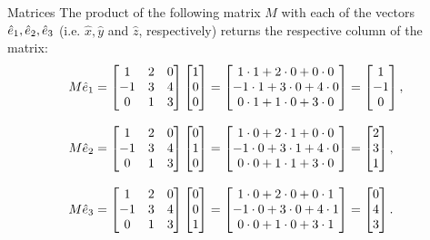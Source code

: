 \begin{example}{Matrices}{}
	The product of the following matrix $M$ with each of the vectors $\hat{e}_{1},\hat{e}_{2},\hat{e}_{3}$ (i.e. $\hat{x},\hat{y}$ and $\hat{z}$, respectively) returns the respective column of the matrix:
	\begin{align*}
		M\eb{1}=
		\begin{bmatrix}
			 1 & 2 & 0\\
			-1 & 3 & 4\\
			 0 & 1 & 3\\
		 \end{bmatrix}\colvec{1;0;0} &= \colvec{1\cdot1+2\cdot0+0\cdot0;-1\cdot1+3\cdot0+4\cdot0;0\cdot1+1\cdot0+3\cdot0} = \colvec{1;-1;0},\\[3mm]
		M\eb{2}=
		\begin{bmatrix}
			 1 & 2 & 0\\
			-1 & 3 & 4\\
			 0 & 1 & 3\\
		\end{bmatrix}\colvec{0;1;0} &= \colvec{1\cdot0+2\cdot1+0\cdot0;-1\cdot0+3\cdot1+4\cdot0;0\cdot0+1\cdot1+3\cdot0} = \colvec{2;3;1},\\[3mm]
		M\eb{3}=
		\begin{bmatrix}
			 1 & 2 & 0\\
			-1 & 3 & 4\\
			 0 & 1 & 3\\
		\end{bmatrix}\colvec{0;0;1} &= \colvec{1\cdot0+2\cdot0+0\cdot1;-1\cdot0+3\cdot0+4\cdot1;0\cdot0+1\cdot0+3\cdot1} = \colvec{0;4;3}.
	\end{align*}
\end{example}
